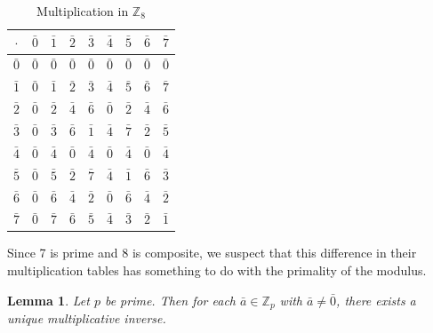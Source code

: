 \documentclass[10pt, titlepage]{amsart}
\newcommand\Z{{\mathbb Z}}
\newtheorem{lemma}{Lemma}[subsection]
\theoremstyle{definition}
\begin{document}
\begin{table}[h!]
\begin{minipage}{0.48\textwidth}
			\caption{Multiplication in $\Z_8$}
			\label{table:multiplication_in_Z8}
			\begin{tabular}{|c|c|c|c|c|c|c|c|c|}
				\hline
				$\cdot$		& $\bar{0}$ & $\bar{1}$ & $\bar{2}$ & $\bar{3}$ & $\bar{4}$ & $\bar{5}$ & $\bar{6}$ & $\bar{7}$ \\ \hline
				$\bar{0}$	& $\bar{0}$ & $\bar{0}$ & $\bar{0}$ & $\bar{0}$ & $\bar{0}$ & $\bar{0}$ & $\bar{0}$ & $\bar{0}$ \\ \hline
				$\bar{1}$	& $\bar{0}$ & \cellcolor[HTML]{9AFF99}$\bar{1}$ & $\bar{2}$ & $\bar{3}$ & $\bar{4}$ & $\bar{5}$ & $\bar{6}$ & $\bar{7}$ \\ \hline
				$\bar{2}$	& $\bar{0}$ & $\bar{2}$ & $\bar{4}$ & $\bar{6}$ & $\bar{0}$ & $\bar{2}$ & $\bar{4}$ & $\bar{6}$ \\ \hline
				$\bar{3}$	& $\bar{0}$ & $\bar{3}$ & $\bar{6}$ & \cellcolor[HTML]{9AFF99}$\bar{1}$ & $\bar{4}$ & $\bar{7}$ & $\bar{2}$ & $\bar{5}$ \\ \hline
				$\bar{4}$	& $\bar{0}$ & $\bar{4}$ & $\bar{0}$ & $\bar{4}$ & $\bar{0}$ & $\bar{4}$ & $\bar{0}$ & $\bar{4}$ \\ \hline
				$\bar{5}$	& $\bar{0}$ & $\bar{5}$ & $\bar{2}$ & $\bar{7}$ & $\bar{4}$ & \cellcolor[HTML]{9AFF99}$\bar{1}$ & $\bar{6}$ & $\bar{3}$ \\ \hline
				$\bar{6}$	& $\bar{0}$ & $\bar{6}$ & $\bar{4}$ & $\bar{2}$ & $\bar{0}$ & $\bar{6}$ & $\bar{4}$ & $\bar{2}$ \\ \hline
				$\bar{7}$	& $\bar{0}$ & $\bar{7}$ & $\bar{6}$ & $\bar{5}$ & $\bar{4}$ & $\bar{3}$ & $\bar{2}$ & \cellcolor[HTML]{9AFF99}$\bar{1}$ \\ \hline
			\end{tabular}
		\end{minipage}
	\end{table}	
	
	Since 7 is prime and 8 is composite, we suspect that this difference in their multiplication tables has something to do with the primality of the modulus. %
	
	
	\begin{lemma}\label{lemma:unique_inverses_in_Zp}
		Let $p$ be prime. Then for each $\bar{a} \in \Z_p$ with $\bar{a} \neq \bar{0}$, there exists a unique multiplicative inverse.
	\end{lemma}
	
\end{document}
